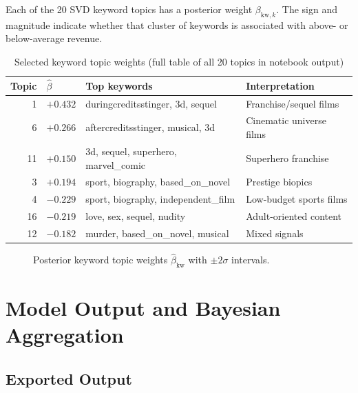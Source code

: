 \documentclass[12pt,a4paper]{article}
\begin{document}
Each of the 20 SVD keyword topics has a posterior weight $\beta_{\text{kw},k}$.
The sign and magnitude indicate whether that cluster of keywords is associated
with above- or below-average revenue.

\begin{table}[H]
\centering
\small
\begin{tabular}{rlll}
\toprule
\textbf{Topic} & \textbf{$\hat{\beta}$} & \textbf{Top keywords} & \textbf{Interpretation} \\
\midrule
 1 & $+0.432$ & duringcreditsstinger, 3d, sequel    & Franchise/sequel films \\
 6 & $+0.266$ & aftercreditsstinger, musical, 3d    & Cinematic universe films \\
11 & $+0.150$ & 3d, sequel, superhero, marvel\_comic & Superhero franchise \\
 3 & $+0.194$ & sport, biography, based\_on\_novel   & Prestige biopics \\
 4 & $-0.229$ & sport, biography, independent\_film  & Low-budget sports films \\
16 & $-0.219$ & love, sex, sequel, nudity            & Adult-oriented content \\
12 & $-0.182$ & murder, based\_on\_novel, musical     & Mixed signals \\
\bottomrule
\end{tabular}
\caption{Selected keyword topic weights (full table of all 20 topics in notebook output)}
\end{table}

\begin{figure}[H]
  \centering
  \caption{Posterior keyword topic weights $\hat{\beta}_\text{kw}$ with $\pm 2\sigma$ intervals.}
\end{figure}

\section{Model Output and Bayesian Aggregation}

\subsection{Exported Output}
\end{document}
